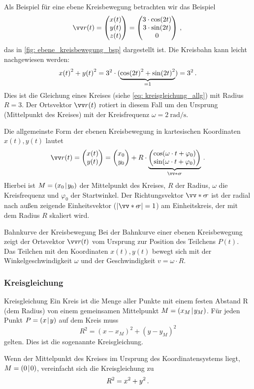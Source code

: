 Als Beispiel für eine ebene Kreisbewegung betrachten wir das Beispiel
\begin{equation}
    \ivec{r}(t) = \icolThree{x(t)}{y(t)}{z(t)} = \icolThree{3\cdot \cos(2t)}{3 \cdot \sin(2t)}{0} \mComma
\end{equation}
das in \cref{fig: ebene_kreisbewegung_bsp} dargestellt ist. 
Die Kreisbahn kann leicht nachgewiesen werden:
\begin{equation*}
    {x(t)}^2 + {y(t)}^2 = 3^2 \cdot (\underbrace{{\cos(2t)}^2 + {\sin(2t)}^2}_{=1}) = 3^2 \,.
\end{equation*}
Dies ist die Gleichung eines Kreises (siehe \cref{eq: kreisgleichung_allg}) mit Radius $R = 3$. Der Ortsvektor $\ivec{r}(t)$ rotiert in diesem Fall um den Ursprung (Mittelpunkt des Kreises) mit der Kreisfrequenz $\omega = \SI{2}{\radian\per\second}$. 

Die allgemeinste Form der ebenen Kreisbewegung in kartesischen Koordinaten $x(t),y(t)$ lautet
\begin{equation}\label{eq: ebene_kreisbewegung_allg}
    \ivec{r}(t) = \icolTwo{x(t)}{y(t)} = \icolTwo{x_0}{y_0} + R \cdot \underbrace{\icolTwo{\cos(\omega\cdot t + \varphi_0)}{\sin(\omega\cdot t + \varphi_0)}}_{\ivecS{e}{r}}\mDot
\end{equation}
Hierbei ist $M = (x_0\!\mid\! y_0)$ der Mittelpunkt des Kreises, $R$ der Radius, $\omega$ die Kreisfrequenz und $\varphi_0$ der Startwinkel. Der Richtungsvektor $\ivecS{e}{r}$ ist der radial nach außen zeigende Einheitsvektor ($|\ivecS{e}{r}| = 1$) am Einheitskreis, der mit dem Radius $R$ skaliert wird.  
\begin{rememberbox}{Bahnkurve der Kreisbewegung}
    Bei der Bahnkurve einer ebenen Kreisbewegung zeigt der Ortsvektor $\ivec{r}(t)$ vom Ursprung zur Position des Teilchens $P(t)$. Das Teilchen mit den Koordinaten $x(t), y(t)$ bewegt sich mit der Winkelgeschwindigkeit $\omega$ und der Geschwindigkeit $v = \omega\cdot R$.  
\end{rememberbox}

\subsubsection{Kreisgleichung}
\begin{rememberbox}{Kreisgleichung}
    Ein Kreis ist die Menge aller Punkte mit einem festen Abstand R (dem Radius) von einem gemeinsamen Mittelpunkt $M = (x_M\!\mid\! y_M)$. Für jeden Punkt $P=(x\!\mid\! y)$ auf dem Kreis muss
    \begin{equation}\label{eq: kreisgleichung_allg}
        R^2 = {(x-x_M)}^2 + {(y-y_M)}^2 
    \end{equation}
    gelten. Dies ist die sogenannte Kreisgleichung. 
\end{rememberbox}
Wenn der Mittelpunkt des Kreises im Ursprung des Koordinatensystems liegt, $M = (0\!\mid\! 0)$, vereinfacht sich die Kreisgleichung zu 
\begin{equation*}
    R^2 = x^2 + y^2 \,.
\end{equation*}



